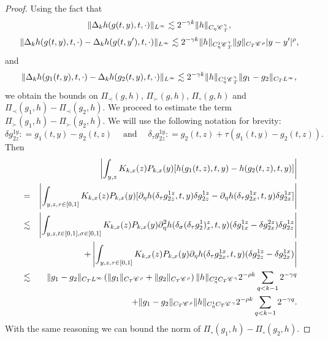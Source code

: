\documentclass[11pt,reqno]{amsart}
\newcommand{\tmop}[1]{\ensuremath{\operatorname{#1}}}
\newcommand{\CC}{\mathscr{C} \hspace{.1em}}
\begin{document}
\begin{proof}
  Using the fact that
  \[ \| \Delta_k h (g (t, y), t, \cdot) \|_{L^{\infty}} \lesssim 2^{- \gamma
     k} \| h \|_{C_{\eta} \CC_T^{\gamma}}, \]
  \[ \| \Delta_k h (g (t, y), t, \cdot) - \Delta_k h (g (t, y'), t, \cdot)
     \|_{L^{\infty}} \lesssim 2^{- \gamma k} \| h \|_{C_{\eta}^1
     \CC_T^{\gamma}} \| g \|_{C_T  \CC^{\rho}} | y - y' |^{\rho}, \]
  and
  \[ \| \Delta_k h (g_1 (t, y), t, \cdot) - \Delta_k h (g_2 (t, y), t, \cdot)
     \|_{L^{\infty}} \lesssim 2^{- \gamma k} \| h \|_{C_{\eta}^1
     \CC_T^{\gamma}} \| g_1 - g_2 \|_{C_T L^{\infty}}, \]
  we obtain the bounds on $\Pi_{\prec} (g, h)$, $\Pi_{\succ} (g, h)$,
  $\Pi_{\circ} (g, h)$ and $\Pi_{\prec} (g_1, h) - \Pi_{\prec} (g_2, h)$. We
  proceed to estimate the term $\Pi_{\succ} (g_1, h) - \Pi_{\succ} (g_2, h)$.
  We will use the following notation for brevity:
  \[ \delta g_{2 z}^{1 y} : = g_1 (t, y) - g_2 (t, z) \quad \tmop{and} \quad
     \delta_{\tau} g_{2 z}^{1 y} : = g_2 (t, z) + \tau (g_1  (t, y) - g_2 (t,
     z)) . \]
  Then
  \begin{eqnarray*}
    &  & \left| \int_{y, z} K_{k, x} (z) P_{k, x} (y) [h (g_1 (t, z), t, y) -
    h (g_2 (t, z), t, y)] \right|\\
    & = & \left| \int_{y, z, \tau \in [0, 1]} K_{k, x} (z) P_{k, x} (y)
    [\partial_{\eta} h (\delta_{\tau} g_{2 z}^{1 z}, t, y) \delta g_{2 z}^{1
    z} - \partial_{\eta} h (\delta_{\tau} g_{2 x}^{1 x}, t, y) \delta g_{2
    x}^{1 x}] \right|\\
    & \lesssim & \left| \int_{y, z, t \in [0, 1], \sigma \in [0, 1]} K_{k, x}
    (z) P_{k, x} (y) \partial^2_{\eta} h (\delta_{\sigma} (\delta_{\tau}
    g_2^1)^z_x, t, y) (\delta g^{1 z}_{1 x} - \delta g^{2 z}_{2 x}) \delta
    g_{2 z}^{1 z} \right|\\
    &  & + \left| \int_{y, z, \tau \in [0, 1]} K_{k, x} (z) P_{k, x} (y)
    \partial_{\eta} h (\delta_{\tau} g_{2 x}^{1 x}, t, y) (\delta g_{2 z}^{1
    z} - \delta g_{2 x}^{1 x}) \right|\\
    & \lesssim & \| g_1 - g_2 \|_{C_T L^{\infty}} \left( \| g_1 \|_{C_T
    \CC^{\rho}} + \| g_2 \|_{C_T \CC^{\rho}} \right) \| h \|_{C_{\eta}^2 C_T
    \CC^{\gamma}} 2^{- \rho k} \sum_{q < k - 1} 2^{- \gamma q}\\
    &  & + \| g_1 - g_2 \|_{C_T \CC^{\rho}}  \| h \|_{C_{\eta}^1 C_T
    \CC^{\gamma}} 2^{- \rho k} \sum_{q < k - 1} 2^{- \gamma q} .
  \end{eqnarray*}
  With the same reasoning we can bound the norm of $\Pi_{\circ} (g_1, h) -
  \Pi_{\circ} (g_2, h)$.
\end{proof}
\end{document}
